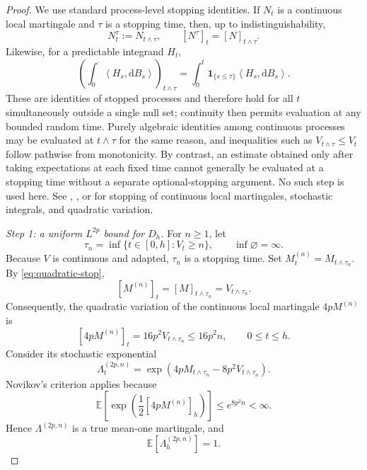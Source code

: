 \documentclass[11pt]{article}
\newcommand{\E}{\mathbb E}
\newcommand{\ip}[2]{\left\langle #1,#2\right\rangle}
\newcommand{\1}{\mathbf 1}
\newcommand{\df}{\mathrm{d}}
\begin{document}
	\begin{proof}
		We use standard process-level stopping identities. If \(N_t\) is a continuous local martingale and
		\(\tau\) is a stopping time, then, up to indistinguishability,
		\begin{equation} \label{eq:quadratic-stop}
			N_t^\tau:=N_{t\wedge\tau},
			\qquad
			[N^\tau]_t=[N]_{t\wedge\tau}.
		\end{equation}
		Likewise, for a predictable integrand \(H_t\),
		\begin{equation}\label{eq:stopped-stochastic-integral}
			\left(\int_0^\cdot\ip{H_s}{\df B_s}\right)_{t\wedge\tau}
			=
			\int_0^t\1_{\{s\leq\tau\}}\ip{H_s}{\df B_s}.
		\end{equation}
		These are identities of stopped processes and therefore hold for all
		\(t\) simultaneously outside a single null set; continuity then permits
		evaluation at any bounded random time. Purely algebraic identities among
		continuous processes may be evaluated at \(t\wedge\tau\) for the same
		reason, and inequalities such as
		\(V_{t\wedge\tau}\leq V_t\) follow pathwise from monotonicity. By
		contrast, an estimate obtained only after taking expectations at each fixed
		time cannot generally be evaluated at a stopping time without a separate
		optional-stopping argument. No such step is used here.
		See \citet[Chapter~IV, Sections~1--2]{RevuzYor1999},
		\citet[Chapter~3]{KaratzasShreve1991}, or
		\citet[Chapter~II]{Protter2005} for stopping of continuous local
		martingales, stochastic integrals, and quadratic variation.
		
		\smallskip
		\noindent\emph{Step 1: a uniform \(L^{2p}\) bound for \(D_h\).}
		For \(n\geq1\), let
		\[
		\tau_n=\inf\{t\in[0,h]:V_t\geq n\},
		\qquad
		\inf\varnothing=\infty.
		\]
		Because \(V\) is continuous and adapted, \(\tau_n\) is a stopping time.
		Set \(M_t^{(n)}=M_{t\wedge\tau_n}\). By \eqref{eq:quadratic-stop},
		\[
		[M^{(n)}]_t=[M]_{t\wedge\tau_n}=V_{t\wedge\tau_n}.
		\]
		Consequently, the quadratic variation of the continuous local martingale
		\(4pM^{(n)}\) is
		\[
		[4pM^{(n)}]_t
		=
		16p^2V_{t\wedge\tau_n}
		\leq16p^2n,
		\qquad 0\leq t\leq h.
		\]
		Consider its stochastic exponential
		\[
		\Lambda_t^{(2p,n)}
		=
		\exp\left(
		4pM_{t\wedge\tau_n}-8p^2V_{t\wedge\tau_n}
		\right).
		\]
		Novikov's criterion applies because
		\[
		\E\left[
		\exp\left(\frac12[4pM^{(n)}]_h\right)
		\right]
		\leq e^{8p^2n}<\infty.
		\]
		Hence \(\Lambda^{(2p,n)}\) is a true mean-one martingale, and
		\begin{equation}\label{eq:Lambda-mean-one}
			\E\left[\Lambda_h^{(2p,n)}\right]=1.
		\end{equation}
		

\end{proof}
\end{document}
